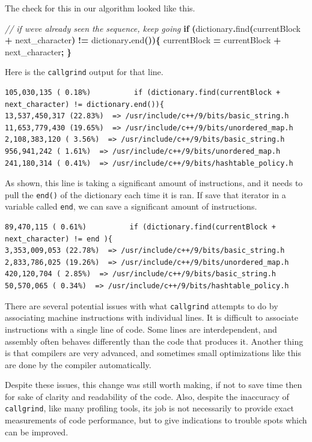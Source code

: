 \documentclass[12pt,twoside]{reedthesis}
\newenvironment{Shaded}{\begin{snugshade}}{\end{snugshade}}
\newcommand{\CommentTok}[1]{\textcolor[rgb]{0.56,0.35,0.01}{\textit{#1}}}
\newcommand{\ControlFlowTok}[1]{\textcolor[rgb]{0.13,0.29,0.53}{\textbf{#1}}}
\newcommand{\NormalTok}[1]{#1}
\newcommand{\OperatorTok}[1]{\textcolor[rgb]{0.81,0.36,0.00}{\textbf{#1}}}
\begin{document}
The check for this in our algorithm looked like this.
\begin{Shaded}
\begin{Highlighting}[]
\CommentTok{// if we\textquotesingle{}ve already seen the sequence, keep going}
\ControlFlowTok{if} \OperatorTok{(}\NormalTok{dictionary}\OperatorTok{.}\NormalTok{find}\OperatorTok{(}\NormalTok{currentBlock }\OperatorTok{+}\NormalTok{ next\_character}\OperatorTok{)} \OperatorTok{!=}\NormalTok{ dictionary}\OperatorTok{.}\NormalTok{end}\OperatorTok{())\{}
\NormalTok{    currentBlock }\OperatorTok{=}\NormalTok{ currentBlock }\OperatorTok{+}\NormalTok{ next\_character}\OperatorTok{;}
\OperatorTok{\}}
\end{Highlighting}
\end{Shaded}
Here is the \texttt{callgrind} output for that line.
\begin{verbatim}
105,030,135 ( 0.18%)          if (dictionary.find(currentBlock + next_character) != dictionary.end()){
13,537,450,317 (22.83%)  => /usr/include/c++/9/bits/basic_string.h
11,653,779,430 (19.65%)  => /usr/include/c++/9/bits/unordered_map.h
2,108,383,120 ( 3.56%)  => /usr/include/c++/9/bits/basic_string.h
956,941,242 ( 1.61%)  => /usr/include/c++/9/bits/unordered_map.h
241,180,314 ( 0.41%)  => /usr/include/c++/9/bits/hashtable_policy.h
\end{verbatim}
As shown, this line is taking a significant amount of instructions, and it needs to pull the \texttt{end()} of the dictionary each time it is ran. If save that iterator in a variable called \texttt{end}, we can save a significant amount of instructions.
\begin{verbatim}
89,470,115 ( 0.61%)          if (dictionary.find(currentBlock + next_character) != end ){
3,353,009,053 (22.78%)  => /usr/include/c++/9/bits/basic_string.h
2,833,786,025 (19.26%)  => /usr/include/c++/9/bits/unordered_map.h
420,120,704 ( 2.85%)  => /usr/include/c++/9/bits/basic_string.h
50,570,065 ( 0.34%)  => /usr/include/c++/9/bits/hashtable_policy.h
\end{verbatim}
There are several potential issues with what \texttt{callgrind} attempts to do by associating machine instructions with individual lines. It is difficult to associate instructions with a single line of code. Some lines are interdependent, and assembly often behaves differently than the code that produces it. Another thing is that compilers are very advanced, and sometimes small optimizations like this are done by the compiler automatically.

Despite these issues, this change was still worth making, if not to save time then for sake of clarity and readability of the code. Also, despite the inaccuracy of \texttt{callgrind}, like many profiling tools, its job is not necessarily to provide exact measurements of code performance, but to give indications to trouble spots which can be improved.
\end{document}
